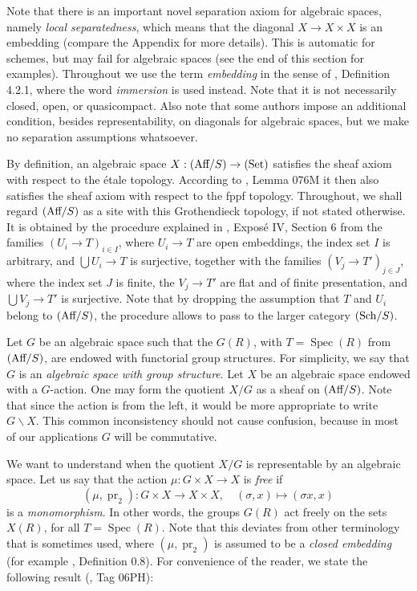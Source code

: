 \documentclass[oneside, 12pt]{amsart}
\theoremstyle{definition}
\theoremstyle{remark}
\newcommand{\Aff}{\text{\rm Aff}}
\newcommand{\lra}{\longrightarrow}
\newcommand{\pr}{\operatorname{pr}}
\newcommand{\ra}{\rightarrow}
\newcommand{\Set}{{\text{\rm Set}}}
\newcommand{\Sch}{\text{\rm Sch}}
\newcommand{\Spec}{\operatorname{Spec}}
\begin{document}
Note that there  is an  important novel separation axiom for
algebraic spaces, namely \emph{local separatedness}, which means that the diagonal $X\ra X\times X$
is an embedding (compare the Appendix for more details).
This is automatic for schemes, but  may fail for algebraic spaces (see the end of this section for examples).
Throughout we use the term \emph{embedding} in the sense of \cite{EGA I}, Definition 4.2.1, where the word \emph{immersion}
is used instead. Note that it is not necessarily closed, open, or quasicompact.
Also note that   some authors impose an additional condition, besides representability,  on      diagonals  for algebraic spaces, 
but we make no  separation assumptions whatsoever.

By definition, an algebraic space $X:(\Aff/S)\ra(\Set)$ satisfies the sheaf axiom with respect to the \'etale topology.
According to \cite{SP}, Lemma 076M it then also satisfies the sheaf axiom with respect to the fppf topology.
Throughout, we shall  regard $(\Aff/S)$ as a site with  this Grothendieck topology, if not stated otherwise.
It is obtained by the procedure explained in \cite{SGA 3a}, Expos\'e IV, Section 6 
from the families $(U_i\ra T)_{i\in I}$, where  $U_i\ra T$ are open embeddings, the index set $I$ is arbitrary, and $\bigcup U_i \ra T$ is surjective, 
together with the families $(V_j\ra T')_{j\in J}$, where  the index set $J$ is finite, the $V_j\ra T'$ are flat and of finite presentation,
and $\bigcup V_j\ra T'$ is surjective. Note that by dropping the assumption that $T$ and $U_i$ belong  to  $(\Aff/S)$,
the procedure allows to  pass to the larger category $(\Sch/S)$. 

Let $G$ be an algebraic space such that the $G(R)$, with $T=\Spec(R)$ from $(\Aff/S)$,  are endowed with   functorial group structures.
For simplicity, we say that $G$ is an \emph{algebraic space with  group structure}.
Let  $X$ be an algebraic space endowed with a $G$-action. One may form the quotient $X/G$ as a sheaf on $(\Aff/S)$.
Note that since the action is from the left, it would be more appropriate to write $G\backslash X$.
This common inconsistency should not cause confusion, because   
in most of our applications $G$ will be commutative.

We want to understand when the quotient $X/G$ is representable by an algebraic space.
Let us say that the  action $\mu:G\times X\ra X$ is  \emph{free} if  
$$
(\mu,\pr_2):G\times X\lra X\times X,\quad (\sigma,x)\longmapsto (\sigma x,x)
$$
is a \emph{monomorphism}. In other words, the groups $G(R)$ act freely on the sets $X(R)$, for all   $T=\Spec(R)$.
Note that this deviates from  other terminology that is sometimes used, where $(\mu,\pr_2)$ is assumed to 
be a \emph{closed embedding} (for example  \cite{Mumford; Fogarty; Kirwan 1993}, Definition 0.8).
For convenience of the reader, we state the following  result (\cite{SP}, Tag 06PH):
 
\end{document}
